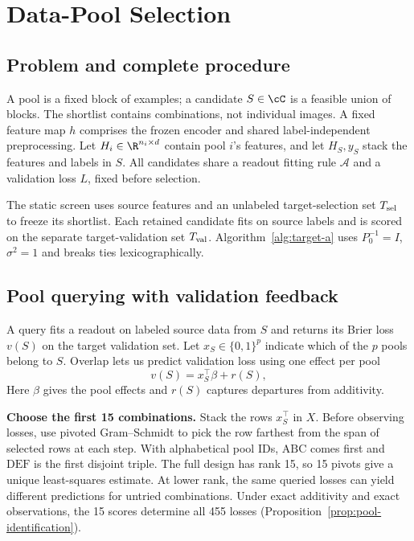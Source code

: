 \section{Data-Pool Selection}
\label{sec:problem}
\label{sec:theory}
\subsection{Problem and complete procedure}
A pool is a fixed block of examples; a candidate $S\in\cC$ is a feasible union of blocks. The shortlist contains combinations, not individual images. A fixed feature map $h$ comprises the frozen encoder and shared label-independent preprocessing. Let $H_i\in\R^{n_i\times d}$ contain pool $i$'s features, and let $H_S,y_S$ stack the features and labels in $S$. All candidates share a readout fitting rule $\mathcal A$ and a validation loss $L$, fixed before selection.

The static screen uses source features and an unlabeled target-selection set $T_{\rm sel}$ to freeze its shortlist. Each retained candidate fits on source labels and is scored on the separate target-validation set $T_{\rm val}$. Algorithm~\ref{alg:target-a} uses $P_0^{-1}=I$, $\sigma^2=1$ and breaks ties lexicographically.

\subsection{Pool querying with validation feedback}
\label{sec:pool-query}
A query fits a readout on labeled source data from $S$ and returns its Brier loss $v(S)$ on the target validation set. Let $x_S\in\{0,1\}^p$ indicate which of the $p$ pools belong to $S$. Overlap lets us predict validation loss using one effect per pool
\begin{equation}
 v(S)=x_S^\top\beta+r(S),
 \label{eq:pool-additive}
\end{equation}
Here $\beta$ gives the pool effects and $r(S)$ captures departures from additivity.

\noindent\textbf{Choose the first 15 combinations.}
Stack the rows $x_S^\top$ in $X$. Before observing losses, use pivoted Gram--Schmidt to pick the row farthest from the span of selected rows at each step. With alphabetical pool IDs, $\mathrm{ABC}$ comes first and $\mathrm{DEF}$ is the first disjoint triple. The full design has rank 15, so 15 pivots give a unique least-squares estimate. At lower rank, the same queried losses can yield different predictions for untried combinations. Under exact additivity and exact observations, the 15 scores determine all 455 losses (Proposition~\ref{prop:pool-identification}).

